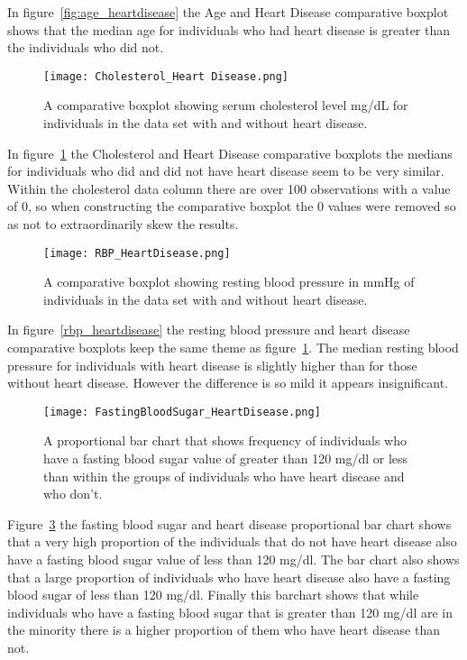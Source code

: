 \documentclass[12pt]{article}
\begin{document}
In figure~\ref{fig:age_heartdisease} the Age and Heart Disease comparative boxplot shows that the median age for individuals who had heart disease is greater than the individuals who did not. 
\begin{figure}[tbp]
  \centering
  \texttt{[image: Cholesterol\_Heart Disease.png]}
  \caption{A comparative boxplot showing serum cholesterol level mg/dL for individuals in the data set with and without heart disease.}
  \label{fig:cholesterol_heartdisease}
\end{figure}
In figure~\ref{fig:cholesterol_heartdisease} the Cholesterol and Heart Disease comparative boxplots the medians for individuals who did and did not have heart disease seem to be very similar. Within the cholesterol data column there are over 100 observations with a value of 0, so when constructing the comparative boxplot the 0 values were removed so as not to extraordinarily skew the results.  
\begin{figure}[tbp]
  \centering
  \texttt{[image: RBP\_HeartDisease.png]}
  \caption{A comparative boxplot showing resting blood pressure in mmHg of individuals in the data set with and without heart disease.}
  \label{fig:rbp_heartdisease}
\end{figure}
In figure~\ref{rbp_heartdisease} the resting blood pressure and heart disease comparative boxplots keep the same theme as figure~\ref{fig:cholesterol_heartdisease}. The median resting blood pressure for individuals with heart disease is slightly higher than for those without heart disease. However the difference is so mild it appears insignificant. 
\begin{figure}[tbp]
  \centering
  \texttt{[image: FastingBloodSugar\_HeartDisease.png]}
  \caption{A proportional bar chart that shows frequency of individuals who have a fasting blood sugar value of greater than 120 mg/dl or less than within the groups of individuals who have heart disease and who don't.}
  \label{fig:FBS_heartdisease}
\end{figure}
Figure~\ref{fig:FBS_heartdisease} the fasting blood sugar and heart disease proportional bar chart shows that a very high proportion of the individuals that do not have heart disease also have a fasting blood sugar value of less than 120 mg/dl. The bar chart also shows that a large proportion of individuals who have heart disease also have a fasting blood sugar of less than 120 mg/dl. Finally this barchart shows that while individuals who have a fasting blood sugar that is greater than 120 mg/dl are in the minority there is a higher proportion of them who have heart disease than not. 
\end{document}
